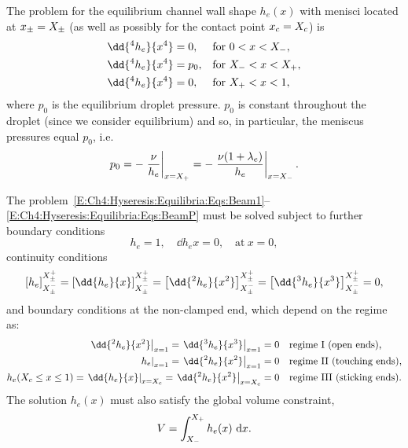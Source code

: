 The problem for the equilibrium channel wall shape $h_e(x)$ with menisci located at $x_{\pm} = X_{\pm}$ (as well as possibly for the contact point $x_c =X_{c}$) is
\begin{align}
\dd{^4 h_e}{x^4} &= 0, & &\text{for}~ 0 < x < \xlefteq,\label{E:Ch4:Hyseresis:Equilibria:Eqs:Beam1}\\
\dd{^4 h_e}{x^4} &= p_0, & &\text{for}~ \xlefteq < x < \xrighteq,\label{E:Ch4:Hyseresis:Equilibria:Eqs:Beam2}\\
\dd{^4 h_e}{x^4} &= 0, & &\text{for}~ \xrighteq < x < 1,\label{E:Ch4:Hyseresis:Equilibria:Eqs:Beam3}
\end{align}
where $p_0$ is the equilibrium droplet pressure. $p_0$ is constant throughout the droplet (since we consider equilibrium) and so, in particular, the meniscus pressures equal $p_0$, i.e.
\begin{equation}\label{E:Ch4:Hyseresis:Equilibria:Eqs:BeamP}
p_0 = -\left.\frac{\nu}{h_e}\right|_{x = X_{+}}  = -\left.\frac{\nu(1 + \lambda_e) }{h_e}\right|_{x = X_{-}}.
\end{equation}

The problem~\eqref{E:Ch4:Hyseresis:Equilibria:Eqs:Beam1}--\eqref{E:Ch4:Hyseresis:Equilibria:Eqs:BeamP} must be solved subject to further boundary conditions
\begin{equation}\label{E:Ch4:Hyseresis:Equilibria:Eqs:ClampedBC}
h_{e} = 1,\quad  \dd{h_e}{x} = 0, \quad \text{at}~x = 0,
\end{equation}
continuity conditions
\begin{equation}\label{E:Ch4:Hyseresis:Equilibria:Eqs:Continuity}
\left[h_e\right]_{\xpmeq^-}^{\xpmeq^+} = \left[\dd{h_e}{x}\right]_{\xpmeq^-}^{\xpmeq^+} = \left[\dd{^2 h_e}{x^2}\right]_{\xpmeq^-}^{\xpmeq^+}=\left[\dd{^3 h_e}{x^3}\right]_{\xpmeq^-}^{\xpmeq^+}  =0,
\end{equation}
and boundary conditions at the non-clamped end, which depend on the regime as:
\begin{align}
\left.\dd{^2 h_e}{x^2}\right|_{x = 1}  = \left.\dd{^3 h_e}{x^3}\right|_{x = 1} &= 0   & &\text{regime I (open ends),}\label{E:Ch4:Hyseresis:Equilibria:Eqs:FarEndBCFree}\\
\left.h_e\right|_{x = 1}  =   \left.\dd{^2 h_e}{x^2}\right|_{x = 1}&= 0  & &\text{regime II (touching ends),}\label{E:Ch4:Hyseresis:Equilibria:Eqs:FarEndBCTouching}\\
h_e(\xceq \leq x \leq 1) = \left.\dd{h_e}{x}\right|_{x = \xceq} =   \left.\dd{^2 h_e}{x^2}\right|_{x =\xceq} &= 0    & &\text{regime III (sticking ends).}\label{E:Ch4:Hyseresis:Equilibria:Eqs:FarEndBCSticking}
\end{align}
The solution $h_e(x)$ must also satisfy the global volume constraint,
\begin{equation}\label{E:Ch4:Hyseresis:Equilibria:Eqs:Volume}
V = \int_{X_{-}}^{X_{+}}h_e(x)~\mathrm{d}x.
\end{equation}

